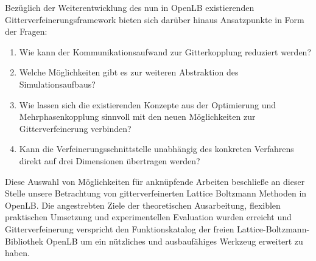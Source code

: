 \noindent
Bezüglich der Weiterentwicklung des nun in OpenLB existierenden Gitterverfeinerungsframework bieten sich darüber hinaus Ansatzpunkte in Form der Fragen:
\begin{enumerate}
	\item Wie kann der Kommunikationsaufwand zur Gitterkopplung reduziert werden?
	\item Welche Möglichkeiten gibt es zur weiteren Abstraktion des Simulationsaufbaus?
	\item Wie lassen sich die existierenden Konzepte aus der Optimierung und Mehrphasenkopplung sinnvoll mit den neuen Möglichkeiten zur Gitterverfeinerung verbinden?
	\item Kann die Verfeinerungsschnittstelle unabhängig des konkreten Verfahrens direkt auf drei Dimensionen übertragen werden?
\end{enumerate}
Diese Auswahl von Möglichkeiten für anknüpfende Arbeiten beschließe an dieser Stelle unsere Betrachtung von gitterverfeinerten Lattice Boltzmann Methoden in OpenLB. Die angestrebten Ziele der theoretischen Ausarbeitung, flexiblen praktischen Umsetzung und experimentellen Evaluation wurden erreicht und Gitterverfeinerung verspricht den Funktionskatalog der freien Lattice-Boltzmann-Bibliothek OpenLB um ein nützliches und ausbaufähiges Werkzeug erweitert zu haben.
